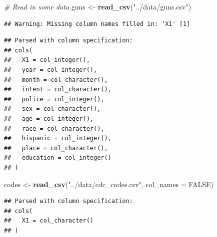 \documentclass[]{article}
\newenvironment{Shaded}{\begin{snugshade}}{\end{snugshade}}
\newcommand{\CommentTok}[1]{\textcolor[rgb]{0.56,0.35,0.01}{\textit{#1}}}
\newcommand{\DataTypeTok}[1]{\textcolor[rgb]{0.13,0.29,0.53}{#1}}
\newcommand{\KeywordTok}[1]{\textcolor[rgb]{0.13,0.29,0.53}{\textbf{#1}}}
\newcommand{\NormalTok}[1]{#1}
\newcommand{\OtherTok}[1]{\textcolor[rgb]{0.56,0.35,0.01}{#1}}
\newcommand{\StringTok}[1]{\textcolor[rgb]{0.31,0.60,0.02}{#1}}
\begin{document}
\begin{Shaded}
\begin{Highlighting}[]
\CommentTok{# Read in some data}
\NormalTok{guns <-}\StringTok{ }\KeywordTok{read_csv}\NormalTok{(}\StringTok{"../data/guns.csv"}\NormalTok{)}
\end{Highlighting}
\end{Shaded}

\begin{verbatim}
## Warning: Missing column names filled in: 'X1' [1]
\end{verbatim}

\begin{verbatim}
## Parsed with column specification:
## cols(
##   X1 = col_integer(),
##   year = col_integer(),
##   month = col_character(),
##   intent = col_character(),
##   police = col_integer(),
##   sex = col_character(),
##   age = col_integer(),
##   race = col_character(),
##   hispanic = col_integer(),
##   place = col_character(),
##   education = col_integer()
## )
\end{verbatim}

\begin{Shaded}
\begin{Highlighting}[]
\NormalTok{codes <-}\StringTok{ }\KeywordTok{read_csv}\NormalTok{(}\StringTok{"../data/cdc_codes.csv"}\NormalTok{, }\DataTypeTok{col_names =} \OtherTok{FALSE}\NormalTok{)}
\end{Highlighting}
\end{Shaded}

\begin{verbatim}
## Parsed with column specification:
## cols(
##   X1 = col_character()
## )
\end{verbatim}
\end{document}
